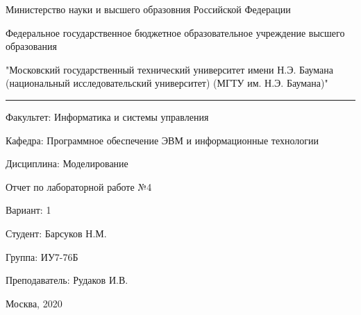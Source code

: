 \begin{center}
	Министерство науки и высшего образовния Российской Федерации
		
	Федеральное государственное бюджетное образовательное учреждение 
	высшего образования
	
	"Московский государственный технический университет имени Н.Э. Баумана (национальный исследовательский университет) (МГТУ им. Н.Э. Баумана)"
\end{center}

\hrule

\begin{flushleft}
	Факультет: Информатика и системы управления
	
	Кафедра: Программное обеспечение ЭВМ и информационные технологии
	
	Дисциплина: Моделирование
\end{flushleft}

\vspace{2cm}

\begin{center}
	Отчет по лабораторной работе №4
	
	Вариант: 1
\end{center}

\vspace{2cm}

\begin{flushleft}
	Студент: Барсуков Н.М.

	Группа: ИУ7-76Б
	
	Преподаватель: Рудаков И.В.
\end{flushleft}

\vspace*{\fill}
\begin{center}
	Москва, 2020
\end{center}

